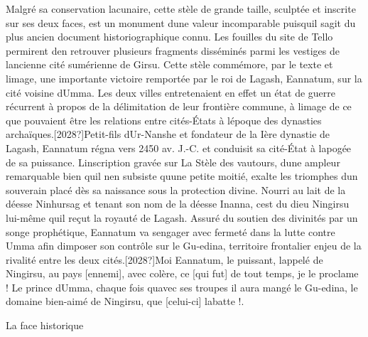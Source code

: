 \documentclass{article}
\begin{document}
Malgré sa conservation lacunaire, cette stèle de grande taille, sculptée
et inscrite sur ses deux faces, est un monument d{\textquotesingle}une
valeur incomparable puisqu{\textquotesingle}il s{\textquotesingle}agit
du plus ancien document historiographique connu. Les fouilles du site
de Tello permirent d{\textquotesingle}en retrouver plusieurs fragments
disséminés parmi les vestiges de l{\textquotesingle}ancienne cité
sumérienne de Girsu. Cette stèle commémore, par le texte et
l{\textquotesingle}image, une importante victoire remportée par le roi
de Lagash, Eannatum, sur la cité voisine d{\textquotesingle}Umma. Les
deux villes entretenaient en effet un état de guerre récurrent à propos
de la délimitation de leur frontière commune, à
l{\textquotesingle}image de ce que pouvaient être les relations entre
cités-États à l{\textquotesingle}époque des dynasties
archaïques.[2028?]Petit-fils d{\textquotesingle}Ur-Nanshe et fondateur
de la Ière dynastie de Lagash, Eannatum régna vers 2450 av. J.-C. et
conduisit sa cité-État à l{\textquotesingle}apogée de sa puissance.
L{\textquotesingle}inscription gravée sur La Stèle des vautours,
d{\textquotesingle}une ampleur remarquable bien qu{\textquotesingle}il
n{\textquotesingle}en subsiste qu{\textquotesingle}une petite moitié,
exalte les triomphes d{\textquotesingle}un souverain placé dès sa
naissance sous la protection divine. Nourri au lait de la déesse
Ninhursag et tenant son nom de la déesse Inanna, c{\textquotesingle}est
du dieu Ningirsu lui-même qu{\textquotesingle}il reçut la royauté de
Lagash. Assuré du soutien des divinités par un songe prophétique,
Eannatum va s{\textquotesingle}engager avec fermeté dans la lutte
contre Umma afin d{\textquotesingle}imposer son contrôle sur le
Gu-edina, territoire frontalier enjeu de la rivalité entre les deux
cités.[2028?]{\textquotedbl}Moi Eannatum, le puissant,
l{\textquotesingle}appelé de Ningirsu, au pays [ennemi], avec colère,
ce [qui fut] de tout temps, je le proclame ! Le prince
d{\textquotesingle}Umma, chaque fois qu{\textquotesingle}avec ses
troupes il aura mangé le Gu-edina, le domaine bien-aimé de Ningirsu,
que [celui-ci] l{\textquotesingle}abatte !{\textquotedbl}.

La face {\textquotedbl}historique{\textquotedbl}
\end{document}
